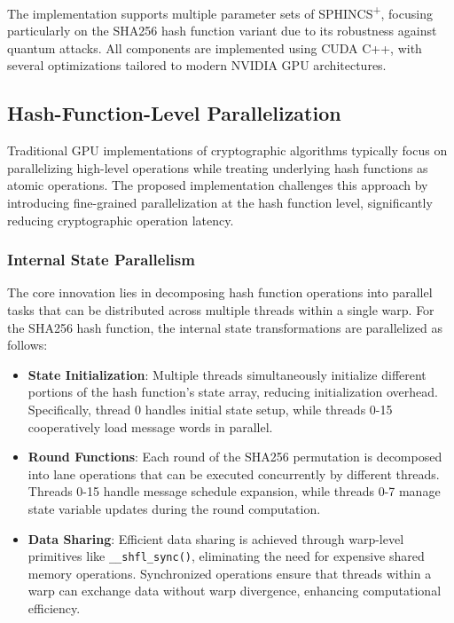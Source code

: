 \documentclass[journal]{IEEEtran}
\begin{document}

The implementation supports multiple parameter sets of SPHINCS\textsuperscript{+}, focusing particularly on the SHA256 hash function variant due to its robustness against quantum attacks. All components are implemented using CUDA C++, with several optimizations tailored to modern NVIDIA GPU architectures.

\subsection{Hash-Function-Level Parallelization}

Traditional GPU implementations of cryptographic algorithms typically focus on parallelizing high-level operations while treating underlying hash functions as atomic operations. The proposed implementation challenges this approach by introducing fine-grained parallelization at the hash function level, significantly reducing cryptographic operation latency.

\subsubsection{Internal State Parallelism}

The core innovation lies in decomposing hash function operations into parallel tasks that can be distributed across multiple threads within a single warp. For the SHA256 hash function, the internal state transformations are parallelized as follows:

\begin{itemize}
  \item \textbf{State Initialization}: Multiple threads simultaneously initialize different portions of the hash function's state array, reducing initialization overhead. Specifically, thread 0 handles initial state setup, while threads 0-15 cooperatively load message words in parallel.
  \item \textbf{Round Functions}: Each round of the SHA256 permutation is decomposed into lane operations that can be executed concurrently by different threads. Threads 0-15 handle message schedule expansion, while threads 0-7 manage state variable updates during the round computation.
  \item \textbf{Data Sharing}: Efficient data sharing is achieved through warp-level primitives like \texttt{\_\_shfl\_sync()}, eliminating the need for expensive shared memory operations. Synchronized operations ensure that threads within a warp can exchange data without warp divergence, enhancing computational efficiency.
\end{itemize}
\end{document}
